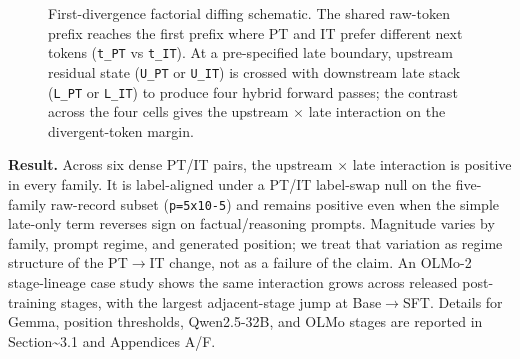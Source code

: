 \documentclass[11pt]{article}
\begin{document}
\begin{figure}[t]
\centering
{}
\caption{First-divergence factorial diffing schematic. The shared raw-token prefix reaches the first prefix where PT and IT prefer different next tokens (\texttt{t\_PT} vs \texttt{t\_IT}). At a pre-specified late boundary, upstream residual state (\texttt{U\_PT} or \texttt{U\_IT}) is crossed with downstream late stack (\texttt{L\_PT} or \texttt{L\_IT}) to produce four hybrid forward passes; the contrast across the four cells gives the upstream \ensuremath{\times} late interaction on the divergent-token margin.}
\label{fig:01-first-divergence-decomposition}
\end{figure}

\textbf{Result.} Across six dense PT/IT pairs, the upstream \ensuremath{\times} late interaction is positive in every family. It is label-aligned under a PT/IT label-swap null on the five-family raw-record subset (\texttt{p=5x10-5}) and remains positive even when the simple late-only term reverses sign on factual/reasoning prompts. Magnitude varies by family, prompt regime, and generated position; we treat that variation as regime structure of the PT\ensuremath{\to}IT change, not as a failure of the claim. An OLMo-2 stage-lineage case study shows the same interaction grows across released post-training stages, with the largest adjacent-stage jump at Base\ensuremath{\to}SFT. Details for Gemma, position thresholds, Qwen2.5-32B, and OLMo stages are reported in Section\textasciitilde{}3.1 and Appendices A/F.
\end{document}
